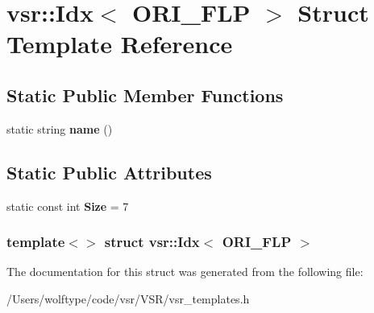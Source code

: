 \hypertarget{structvsr_1_1_idx_3_01_o_r_i___f_l_p_01_4}{\section{vsr\-:\-:Idx$<$ O\-R\-I\-\_\-\-F\-L\-P $>$ Struct Template Reference}
\label{structvsr_1_1_idx_3_01_o_r_i___f_l_p_01_4}
}
\subsection*{Static Public Member Functions}
\begin{DoxyCompactItemize}
\item 
\hypertarget{structvsr_1_1_idx_3_01_o_r_i___f_l_p_01_4_afcf811f0a42e0ddbd7c19dd1627dbc53}{static string {\bfseries name} ()}\label{structvsr_1_1_idx_3_01_o_r_i___f_l_p_01_4_afcf811f0a42e0ddbd7c19dd1627dbc53}

\end{DoxyCompactItemize}
\subsection*{Static Public Attributes}
\begin{DoxyCompactItemize}
\item 
\hypertarget{structvsr_1_1_idx_3_01_o_r_i___f_l_p_01_4_ade50f3a6fa623586c0dbed006311e519}{static const int {\bfseries Size} = 7}\label{structvsr_1_1_idx_3_01_o_r_i___f_l_p_01_4_ade50f3a6fa623586c0dbed006311e519}

\end{DoxyCompactItemize}
\subsubsection*{template$<$$>$ struct vsr\-::\-Idx$<$ O\-R\-I\-\_\-\-F\-L\-P $>$}



The documentation for this struct was generated from the following file\-:\begin{DoxyCompactItemize}
\item 
/\-Users/wolftype/code/vsr/\-V\-S\-R/vsr\-\_\-templates.\-h\end{DoxyCompactItemize}
